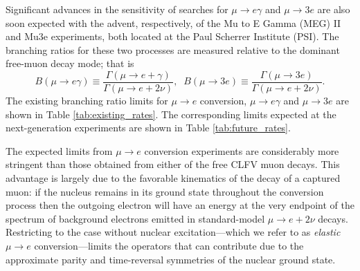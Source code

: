 \documentclass[12pt,letterpaper]{book}
\begin{document}
Significant advances in the sensitivity of searches for $\mu\rightarrow e\gamma$ and $\mu\rightarrow 3e$ are also soon expected with the advent, respectively, of the Mu to E Gamma (MEG) II and Mu3e experiments, both located at the Paul Scherrer Institute (PSI). The branching ratios for these two processes are measured relative to the dominant free-muon decay mode; that is
\begin{equation}
B(\mu\rightarrow e\gamma)\equiv\frac{\Gamma\left(\mu\rightarrow e+\gamma\right)}{\Gamma\left(\mu\rightarrow e+2\nu\right)},\;\;B(\mu\rightarrow 3e)\equiv\frac{\Gamma\left(\mu\rightarrow 3e\right)}{\Gamma\left(\mu\rightarrow e+2\nu\right)}.
\end{equation} 
The existing branching ratio limits for $\mu\rightarrow e$ conversion, $\mu\rightarrow e\gamma$ and $\mu\rightarrow 3e$ are shown in Table \ref{tab:existing_rates}. The corresponding limits expected at the next-generation experiments are shown in Table \ref{tab:future_rates}. 

The expected limits from $\mu\rightarrow e$ conversion experiments are considerably more stringent than those obtained from either of the free CLFV muon decays. This advantage is largely due to the favorable kinematics of the decay of a captured muon: if the nucleus remains in its ground state throughout the conversion process then the outgoing electron will have an energy at the very endpoint of the spectrum of background electrons emitted in standard-model $\mu\rightarrow e + 2\nu$ decays. Restricting to the case without nuclear excitation---which we refer to as \textit{elastic} $\mu\rightarrow e$ conversion---limits the operators that can contribute due to the approximate parity and time-reversal symmetries of the nuclear ground state.
\end{document}
